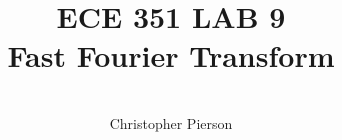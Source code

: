 



\documentclass[12pt]{article}

\usepackage[english]{babel}
\usepackage[utf8x]{inputenc}
\usepackage[T1]{fontenc}
\usepackage{graphicx}
\usepackage{amsmath}
\usepackage{caption}
\usepackage{float}
\usepackage{caption}
\usepackage{subcaption}
\usepackage{rotating}
\usepackage{setspace}

\usepackage[a4paper,top=3cm,bottom=2cm,left=3cm,right=3cm,marginparwidth=1.75cm]{geometry}

\usepackage[colorinlistoftodos]{todonotes}
\usepackage[colorlinks=true, allcolors=blue]{hyperref}
\usepackage{listings}
\usepackage{gensymb}
\usepackage{ mathrsfs }



\title{%
	\textbf{ ECE 351 LAB 9} \\
 Fast Fourier Transform 
	 }

\author{\\
	Christopher Pierson}

	
	
\vspace{\fill}
\maketitle
\vspace{\fill}
\clearpage

